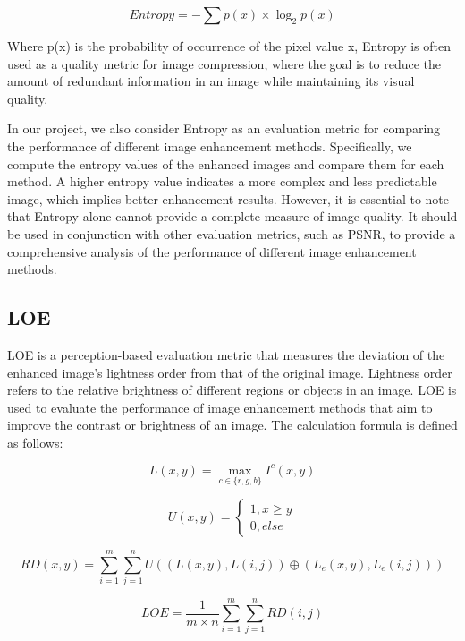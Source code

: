 \documentclass[conference]{IEEEtran}
\begin{document}
\begin{equation}
Entropy = - \sum p(x) \times \log_2p(x)   \label{eq2}
\end{equation}

Where p(x) is the probability of occurrence of the pixel value x, Entropy is often used as a quality metric for image compression, where the goal is to reduce the amount of redundant information in an image while maintaining its visual quality.

In our project, we also consider Entropy as an evaluation metric for comparing the performance of different image enhancement methods. Specifically, we compute the entropy values of the enhanced images and compare them for each method. A higher entropy value indicates a more complex and less predictable image, which implies better enhancement results. However, it is essential to note that Entropy alone cannot provide a complete measure of image quality. It should be used in conjunction with other evaluation metrics, such as PSNR, to provide a comprehensive analysis of the performance of different image enhancement methods.
\subsection{LOE}
LOE is a perception-based evaluation metric that measures the deviation of the enhanced image's lightness order from that of the original image. Lightness order refers to the relative brightness of different regions or objects in an image. LOE is used to evaluate the performance of image enhancement methods that aim to improve the contrast or brightness of an image. The calculation formula is defined as follows:

\begin{equation}
L(x,y) = \max_{c\in\{r,g,b\}} I^c(x,y)  \label{eq3}
\end{equation}

\begin{equation}
U(x,y) = \begin{cases}
1, x\geq y \\
0, else
\end{cases}  \label{eq4}
\end{equation}

\begin{equation}
RD(x,y) = \sum_{i=1}^m \sum_{j=1}^n U((L(x,y) , L(i,j)) \oplus (L_e(x,y) , L_e(i,j)))  \label{eq5}
\end{equation}

\begin{equation}
LOE = \frac{1}{m\times n}\sum_{i=1}^m \sum_{j=1}^n RD(i,j)  \label{eq6}
\end{equation}
\end{document}
